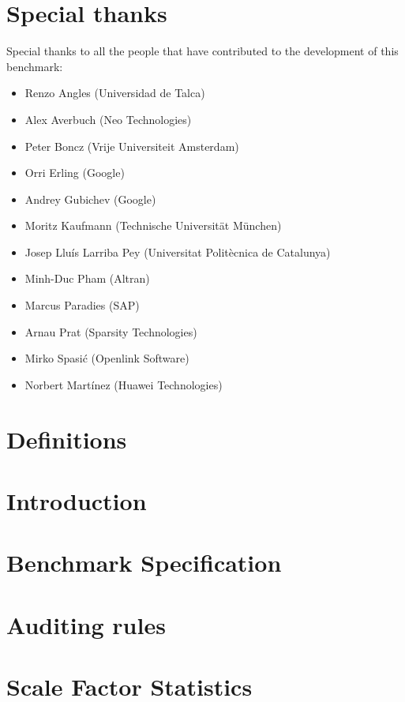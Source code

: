 \documentclass{ldbc}
\begin{document}
\maketitle

%

\chapter*{Special thanks}
Special thanks to all the people that have contributed to the development of
this benchmark:
\begin{itemize}
  \item Renzo Angles (Universidad de Talca)
  \item Alex Averbuch (Neo Technologies)
  \item Peter Boncz (Vrije Universiteit Amsterdam)
  \item Orri Erling (Google)
  \item Andrey Gubichev (Google)
  \item Moritz Kaufmann (Technische Universit\"at M\"unchen)
  \item Josep Llu\'is Larriba Pey (Universitat Polit\`ecnica de Catalunya)
  \item Minh-Duc Pham (Altran)
  \item Marcus Paradies (SAP)
  \item Arnau Prat (Sparsity Technologies)
  \item Mirko Spasi\'c (Openlink Software)
  \item Norbert Mart\'inez (Huawei Technologies)
\end{itemize}

\listoffigures
\listoftables
\chapter*{Definitions}


\chapter{Introduction}


\chapter{Benchmark Specification}


\chapter{Auditing rules}\label{chapter:auditing}





\appendix

\chapter{Scale Factor Statistics}

\end{document}
